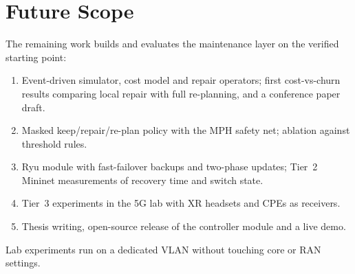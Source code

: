 \section{Future Scope}\label{sec:c_future}
\noindent The remaining work builds and evaluates the maintenance layer on the verified starting point:
\begin{enumerate}
    \item Event-driven simulator, cost model and repair operators; first cost-vs-churn results comparing local repair with full re-planning, and a conference paper draft.
    \item Masked keep/repair/re-plan policy with the MPH safety net; ablation against threshold rules.
    \item Ryu module with fast-failover backups and two-phase updates; Tier~2 Mininet measurements of recovery time and switch state.
    \item Tier~3 experiments in the 5G lab with XR headsets and CPEs as receivers.
    \item Thesis writing, open-source release of the controller module and a live demo.
\end{enumerate}
\noindent Lab experiments run on a dedicated VLAN without touching core or RAN settings.
